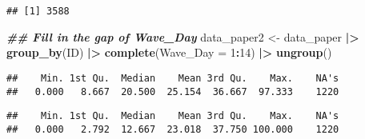 \documentclass[
  12pt,
]{article}
\newenvironment{Shaded}{\begin{snugshade}}{\end{snugshade}}
\newcommand{\AttributeTok}[1]{\textcolor[rgb]{0.13,0.29,0.53}{#1}}
\newcommand{\CommentTok}[1]{\textcolor[rgb]{0.56,0.35,0.01}{\textit{#1}}}
\newcommand{\DecValTok}[1]{\textcolor[rgb]{0.00,0.00,0.81}{#1}}
\newcommand{\DocumentationTok}[1]{\textcolor[rgb]{0.56,0.35,0.01}{\textbf{\textit{#1}}}}
\newcommand{\FunctionTok}[1]{\textcolor[rgb]{0.13,0.29,0.53}{\textbf{#1}}}
\newcommand{\NormalTok}[1]{#1}
\newcommand{\OtherTok}[1]{\textcolor[rgb]{0.56,0.35,0.01}{#1}}
\newcommand{\SpecialCharTok}[1]{\textcolor[rgb]{0.81,0.36,0.00}{\textbf{#1}}}
\begin{document}
\begin{verbatim}
## [1] 3588
\end{verbatim}

\begin{Shaded}
\begin{Highlighting}[]
\DocumentationTok{\#\# Fill in the gap of Wave\_Day}
\NormalTok{data\_paper2 }\OtherTok{\textless{}{-}}\NormalTok{ data\_paper }\SpecialCharTok{|\textgreater{}}
  \FunctionTok{group\_by}\NormalTok{(ID) }\SpecialCharTok{|\textgreater{}}
  \FunctionTok{complete}\NormalTok{(}\AttributeTok{Wave\_Day =} \DecValTok{1}\SpecialCharTok{:}\DecValTok{14}\NormalTok{) }\SpecialCharTok{|\textgreater{}}
  \FunctionTok{ungroup}\NormalTok{()}
\end{Highlighting}
\end{Shaded}

\begin{Shaded}
\end{Shaded}

\begin{verbatim}
##    Min. 1st Qu.  Median    Mean 3rd Qu.    Max.    NA's 
##   0.000   8.667  20.500  25.154  36.667  97.333    1220
\end{verbatim}

\begin{Shaded}
\end{Shaded}

\begin{verbatim}
##    Min. 1st Qu.  Median    Mean 3rd Qu.    Max.    NA's 
##   0.000   2.792  12.667  23.018  37.750 100.000    1220
\end{verbatim}

\begin{Shaded}
\end{Shaded}
\end{document}
